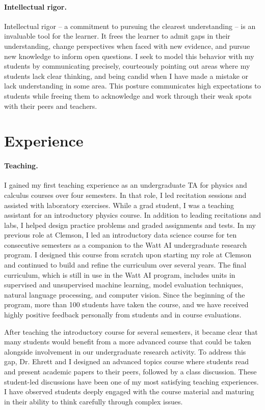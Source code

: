 \documentclass[nobib]{tufte-handout}
\begin{document}
\paragraph{Intellectual rigor.} Intellectual rigor – a commitment to pursuing the clearest understanding – is an invaluable tool for the learner. It frees the learner to admit gaps in their understanding, change perspectives when faced with new evidence, and pursue new knowledge to inform open questions. I seek to model this behavior with my students by communicating precisely, courteously pointing out areas where my students lack clear thinking, and being candid when I have made a mistake or lack understanding in some area. This posture communicates high expectations to students while freeing them to acknowledge and work through their weak spots with their peers and teachers.

\section{Experience}

\paragraph{Teaching.} I gained my first teaching experience as an undergraduate TA for physics and calculus courses over four semesters. In that role, I led recitation sessions and assisted with laboratory exercises. While a grad student, I was a teaching assistant for an introductory physics course. In addition to leading recitations and labs, I helped design practice problems and graded assignments and tests. In my previous role at Clemson, I led an introductory data science course for ten consecutive semesters as a companion to the Watt AI undergraduate research program. I designed this course from scratch upon starting my role at Clemson and continued to build and refine the curriculum over several years. The final curriculum, which is still in use in the Watt AI program, includes units in supervised and unsupervised machine learning, model evaluation techniques, natural language processing, and computer vision. Since the beginning of the program, more than 100 students have taken the course, and we have received highly positive feedback personally from students and in course evaluations.

After teaching the introductory course for several semesters, it became clear that many students would benefit from a more advanced course that could be taken alongside involvement in our undergraduate research activity. To address this gap, Dr. Ehrett and I designed an advanced topics course where students read and present academic papers to their peers, followed by a class discussion. These student-led discussions have been one of my most satisfying teaching experiences. I have observed students deeply engaged with the course material and maturing in their ability to think carefully through complex issues.
\end{document}
